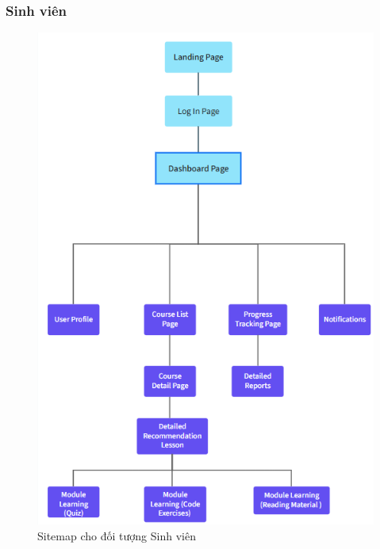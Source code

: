 \subsubsection{Sinh viên}
\begin{figure}[H]
    \centering
    \includegraphics[scale=0.8]{Images/sitemap/Student.png}
    \caption{Sitemap cho đối tượng Sinh viên}
    \label{fig:enter-label}
\end{figure}
